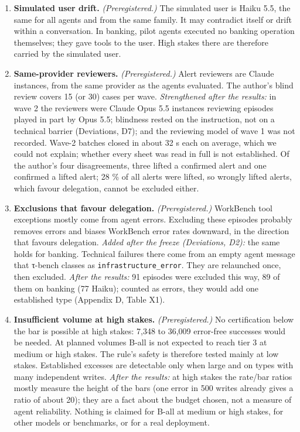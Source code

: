\begin{enumerate}
\item
  \textbf{Simulated user drift.} \emph{(Preregistered.)} The simulated user is Haiku 5.5, the same for all agents and from the same family. It may contradict itself or drift within a conversation. In banking, pilot agents executed no banking operation themselves; they gave tools to the user. High stakes there are therefore carried by the simulated user.
\item
  \textbf{Same-provider reviewers.} \emph{(Preregistered.)} Alert reviewers are Claude instances, from the same provider as the agents evaluated. The author's blind review covers 15 (or 30) cases per wave. \emph{Strengthened after the results:} in wave 2 the reviewers were Claude Opus 5.5 instances reviewing episodes played in part by Opus 5.5; blindness rested on the instruction, not on a technical barrier (Deviations, D7); and the reviewing model of wave 1 was not recorded. Wave-2 batches closed in about 32 s each on average, which we could not explain; whether every sheet was read in full is not established. Of the author's four disagreements, three lifted a confirmed alert and one confirmed a lifted alert; 28 \% of all alerts were lifted, so wrongly lifted alerts, which favour delegation, cannot be excluded either.
\item
  \textbf{Exclusions that favour delegation.} \emph{(Preregistered.)} WorkBench tool exceptions mostly come from agent errors. Excluding these episodes probably removes errors and biases WorkBench error rates downward, in the direction that favours delegation. \emph{Added after the freeze (Deviations, D2):} the same holds for banking. Technical failures there come from an empty agent message that τ-bench classes as \texttt{infrastructure\_\allowbreak{}error}. They are relaunched once, then excluded. \emph{After the results:} 91 episodes were excluded this way, 89 of them on banking (77 Haiku); counted as errors, they would add one established type (Appendix D, Table X1).
\item
  \textbf{Insufficient volume at high stakes.} \emph{(Preregistered.)} No certification below the bar is possible at high stakes: 7,348 to 36,009 error-free successes would be needed. At planned volumes B-all is not expected to reach tier 3 at medium or high stakes. The rule's safety is therefore tested mainly at low stakes. Established excesses are detectable only when large and on types with many independent writes. \emph{After the results:} at high stakes the rate/bar ratios mostly measure the height of the bars (one error in 500 writes already gives a ratio of about 20); they are a fact about the budget chosen, not a measure of agent reliability. Nothing is claimed for B-all at medium or high stakes, for other models or benchmarks, or for a real deployment.

\end{enumerate}
